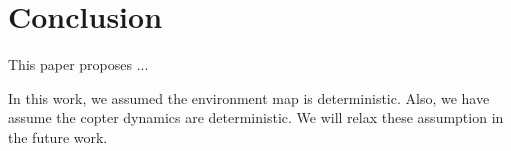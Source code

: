 \documentclass[letterpaper]{article} %
\begin{document}
	
	\section{Conclusion} \label{sec:conclusion}
	This paper proposes ...
	
	In this work, we assumed the environment map is deterministic. Also, we have assume the copter dynamics are deterministic. We will relax these assumption in the future work.

	
	
 
	    
	
	
	
	
	 
	
 
		
		
		
		
\end{document}
